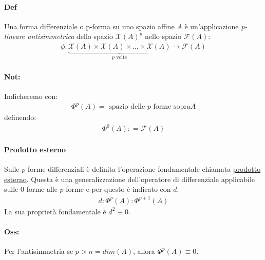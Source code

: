 \paragraph{Def} Una \underline{forma differenziale} o \underline{p-forma} su uno spazio affine $A$ è un'applicazione \textit{p-lineare antisimmetrica} dello spazio $\mathcal{X}(A)^p$ nello spazio $\mathcal{F}(A)$:
\begin{align*}
    \phi \colon \underbrace{\mathcal{X}(A)\times \mathcal{X}(A)\times \dots \times \mathcal{X}(A)}_{p \text{ volte}}\to \mathcal{F}(A)
\end{align*}
\paragraph{Not:}Indicheremo con:
\begin{align*}
    \Phi^p(A)=\text{ spazio delle $p$ forme sopra} A
\end{align*}
definendo:
\begin{align*}
    \Phi^0(A)\colon =\mathcal{F}(A)
\end{align*}
\paragraph{Prodotto esterno} Sulle $p$-forme differenziali è definita l'operazione fondamentale chiamata \underline{prodotto esterno}.
Questa è una generalizzazione dell'operatore di differenziale applicabile sulle $0$-forme alle $p$-forme e per questo è indicato con $d$.
\begin{align*}
    d\colon \Phi^p(A)\colon \Phi ^{p+1}(A)
\end{align*}
La sua proprietà fondamentale è $d^2\equiv 0$.
\paragraph{Oss:} Per l'antisimmetria se $p>n=dim(A)$, allora $\Phi^p(A)\equiv 0$.
